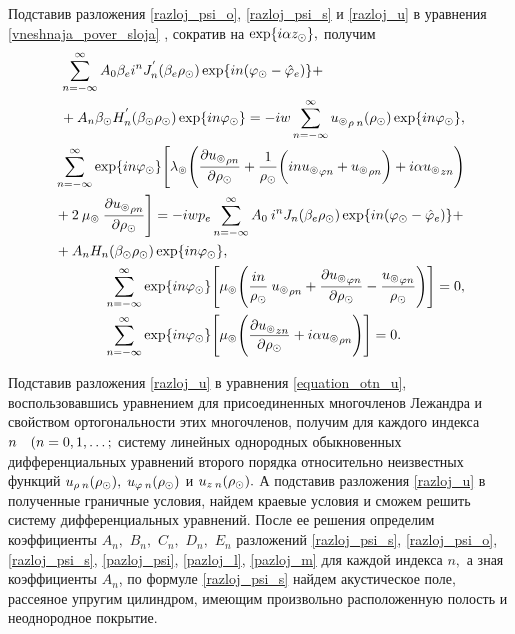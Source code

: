 Подставив разложения \eqref{razloj_psi_o}, \eqref{razloj_psi_s} и \eqref{razloj_u} в уравнения \eqref{vneshnaja_pover_sloja}
, сократив на $\exp\{i\alpha z_\odot\},$ получим
\begin{align}\label{gran_usl_1_with_summ}
\begin{split}
&\sum\limits_{n=-\infty}^{\infty}A_0\beta_e i^n J^{'}_n(\beta_e  \rho_\odot)\exp\{in(\varphi_\odot-\hat{\varphi}_e)\}+\\
&+A_n\beta_\odot H^{'}_n(\beta_\odot \rho_\odot)\exp\{in\varphi_\odot\}=-iw\sum_{n=-\infty}^{\infty}{u_\circledcirc}_{\rho\:n}(\rho_\odot)\exp\{in\varphi_\odot\},
\end{split}\\
\begin{split}
&\sum\limits_{n=-\infty}^{\infty}\exp\{in\varphi_\odot\}\Biggl[\lambda_\circledcirc\Biggl(\frac{\partial {u_\circledcirc}_{\rho n}}{\partial \rho_\odot}+\frac{1}{\rho_\odot}\biggl(in{u_\circledcirc}_{\varphi n}+{u_\circledcirc}_{\rho n}\biggr)+i\alpha{u_\circledcirc}_{zn}\Biggr)\\
&+2\:\mu_\circledcirc\:\frac{\partial {u_\circledcirc}_{\rho n}}{\partial \rho_\odot}\Biggr]=-iwp_e\sum\limits_{n=-\infty}^{\infty}A_0\:i^n J_n(\beta_e  \rho_\odot)\exp\{in(\varphi_\odot-\hat{\varphi}_e)\}+\\
&+A_nH_n(\beta_\odot \rho_\odot)\exp\{in\varphi_\odot\},
\end{split}\\
\begin{split}
&\sum\limits_{n=-\infty}^{\infty}\exp\{in\varphi_\odot\}\Biggl[\mu_\circledcirc\Biggl(\frac{in}{\rho_\odot}\:{u_\circledcirc}_{\rho n}+\frac{\partial {u_\circledcirc}_{\varphi n}}{\partial \rho_\odot}-\frac{{u_\circledcirc}_{\varphi n}}{\rho_\odot}\Biggr)\Biggr]=0,\\
&\sum\limits_{n=-\infty}^{\infty}\exp\{in\varphi_\odot\}\Biggl[\mu_\circledcirc\Biggl(\frac{\partial {u_\circledcirc}_{z n}}{\partial \rho_\odot}+i\alpha{u_\circledcirc}_{\rho n}\Biggr)\Biggr]=0.
\end{split}
\end{align}

Подставив разложения \eqref{razloj_u} в уравнения \eqref{equation_otn_u}, воспользовавшись уравнением для присоединенных многочленов Лежандра и свойством ортогональности этих многочленов, получим для каждого индекса $n \quad(n = 0,1,\ldots;$ систему линейных однородных обыкновенных дифференциальных уравнений второго порядка относительно неизвестных функций $u_{\rho\:n}(\rho_\odot),$ $u_{\varphi\:n}(\rho_\odot)$ и $u_{z\:n}(\rho_\odot).$ А подставив разложения \eqref{razloj_u} в полученные граничные условия, найдем краевые условия и сможем решить  систему дифференциальных уравнений. После ее решения определим коэффициенты $A_n,$ $B_n,$ $C_n,$ $D_n,$ $E_n$ разложений  \eqref{razloj_psi_s}, \eqref{razloj_psi_o}, \eqref{razloj_psi_s}, \eqref{pazloj_psi}, \eqref{pazloj_l}, \eqref{pazloj_m} для каждой индекса $n,$ а зная коэффициенты ${A}_{n}$, по формуле \eqref{razloj_psi_s} найдем акустическое поле, рассеяное упругим цилиндром, имеющим произвольно расположенную полость и неоднородное покрытие.




